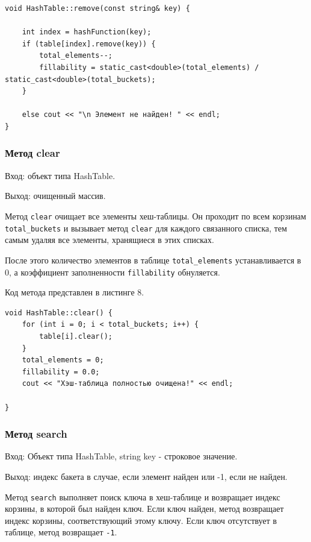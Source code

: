 \documentclass[11pt,a4paper,final]{article} %
\begin{document}
\begin{lstlisting}[label=remove, caption = Метод remove]
void HashTable::remove(const string& key) {
	
	int index = hashFunction(key);
	if (table[index].remove(key)) {
		total_elements--;
		fillability = static_cast<double>(total_elements) / static_cast<double>(total_buckets);
	}
	
	else cout << "\n Элемент не найден! " << endl;
}
\end{lstlisting}


\subsubsection{Метод clear}
Вход: объект типа HashTable. \par
Выход: очищенный массив. \par

\par Метод \texttt{clear} очищает все элементы хеш-таблицы. Он проходит по всем корзинам \texttt{total\_buckets} и вызывает метод \texttt{clear} для каждого связанного списка, тем самым удаляя все элементы, хранящиеся в этих списках.

\par После этого количество элементов в таблице \texttt{total\_elements} устанавливается в 0, а коэффициент заполненности \texttt{fillability} обнуляется.

Код метода представлен в листинге 8.

\begin{lstlisting}[label=Linkedclear, caption = Метод clear]
void HashTable::clear() {
	for (int i = 0; i < total_buckets; i++) {
		table[i].clear();
	}
	total_elements = 0;
	fillability = 0.0;
	cout << "Хэш-таблица полностью очищена!" << endl;

}
\end{lstlisting}

\subsubsection{Метод search}
Вход: Объект типа HashTable, string key - строковое значение. \par
Выход: индекс бакета в случае, если элемент найден или -1, если не найден. 

\par Метод \texttt{search} выполняет поиск ключа в хеш-таблице и возвращает индекс корзины, в которой был найден ключ. Если ключ найден, метод возвращает индекс корзины, соответствующий этому ключу. Если ключ отсутствует в таблице, метод возвращает \texttt{-1}.
\end{document}
